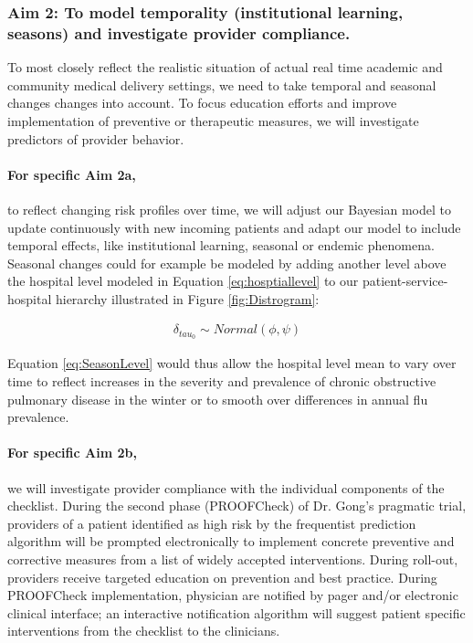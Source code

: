 \documentclass[11pt,notitlepage]{article}
\begin{document}
\subsubsection*{Aim 2: To model temporality (institutional learning, seasons) and investigate provider compliance.}
To most closely reflect the realistic situation of actual real time academic and community medical delivery settings, we need to take temporal and seasonal changes changes into account. To focus education efforts and improve implementation of preventive or therapeutic measures, we will investigate predictors of provider behavior. 

\paragraph*{For specific Aim 2a,} to reflect changing risk profiles over time, we will adjust our Bayesian model to update continuously with new incoming patients and adapt our model to include temporal effects, like institutional learning, seasonal or endemic phenomena. Seasonal changes could for example be modeled by adding another level above the hospital level modeled in Equation \ref{eq:hosptiallevel} to our patient-service-hospital hierarchy illustrated in Figure \ref{fig:Distrogram}:

\begin{figure}
   \vspace{-20pt}
\begin{align}\label{eq:SeasonLevel}
\delta_{tau_{0}} \sim Normal(\phi, \psi) 
\end{align}
   \vspace{-30pt}
\end{figure}

Equation \ref{eq:SeasonLevel} would thus allow the hospital level mean to vary over time to reflect increases in the severity and prevalence of chronic obstructive pulmonary disease in the winter or to smooth over differences in annual flu prevalence. 
  
\paragraph*{For specific Aim 2b,} we will investigate provider compliance with the individual components of the checklist. During the second phase (PROOFCheck) of Dr. Gong's pragmatic trial, providers of a patient identified as high risk by the frequentist prediction algorithm will be prompted electronically to implement concrete preventive and corrective measures from a list of widely accepted interventions. During roll-out, providers receive targeted education on prevention and best practice. During PROOFCheck implementation, physician are notified by pager and/or electronic clinical interface; an interactive notification algorithm will suggest patient specific interventions from the checklist to the clinicians. 
\end{document}
